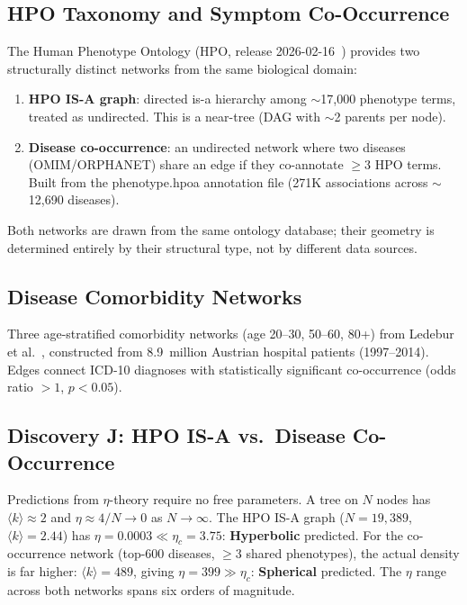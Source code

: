 \documentclass[11pt,a4paper]{article}
\newcommand{\kavg}{\langle k \rangle}
\newcommand{\etac}{\eta_c}
\begin{document}
\subsection{HPO Taxonomy and Symptom Co-Occurrence}
\label{sec:hpo}

The Human Phenotype Ontology (HPO, release 2026-02-16~\cite{kohler2021hpo}) provides two structurally distinct networks from the same biological domain:
\begin{enumerate}
  \item \textbf{HPO IS-A graph}: directed is-a hierarchy among $\sim$17,000 phenotype terms, treated as undirected. This is a near-tree (DAG with $\sim$2 parents per node).
  \item \textbf{Disease co-occurrence}: an undirected network where two diseases (OMIM/ORPHANET) share an edge if they co-annotate $\geq 3$ HPO terms. Built from the phenotype.hpoa annotation file (271K associations across $\sim$12,690 diseases).
\end{enumerate}
Both networks are drawn from the same ontology database; their geometry is determined entirely by their structural type, not by different data sources.

\subsection{Disease Comorbidity Networks}

Three age-stratified comorbidity networks (age 20--30, 50--60, 80+) from Ledebur et al.~\cite{ledebur2025comorbidity}, constructed from 8.9~million Austrian hospital patients (1997--2014). Edges connect ICD-10 diagnoses with statistically significant co-occurrence (odds ratio $>1$, $p<0.05$).

\subsection{Discovery J: HPO IS-A vs.\ Disease Co-Occurrence}

Predictions from $\eta$-theory require no free parameters. A tree on $N$ nodes has $\kavg \approx 2$ and $\eta \approx 4/N \to 0$ as $N \to \infty$. The HPO IS-A graph ($N=19{,}389$, $\kavg=2.44$) has $\eta = 0.0003 \ll \etac = 3.75$: \textbf{Hyperbolic} predicted. For the co-occurrence network (top-600 diseases, $\geq 3$ shared phenotypes), the actual density is far higher: $\kavg = 489$, giving $\eta = 399 \gg \etac$: \textbf{Spherical} predicted. The $\eta$ range across both networks spans six orders of magnitude.
\end{document}
